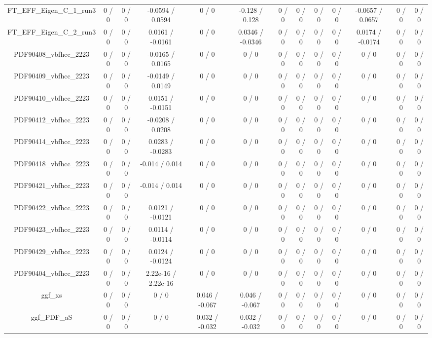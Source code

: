 \documentclass[10pt]{article}
\begin{document}
\begin{table}[htbp]
\begin{center}
\begin{tabular}{|c|c|c|c|c|c|c|c|c|c|c|c|c|}
  FT_EFF_Eigen_C_1_run3 & 0 / 0 & 0 / 0 & -0.0594 / 0.0594 & 0 / 0 & -0.128 / 0.128 & 0 / 0 & 0 / 0 & 0 / 0 & 0 / 0 & -0.0657 / 0.0657 & 0 / 0 & 0 / 0 \\ 
  FT_EFF_Eigen_C_2_run3 & 0 / 0 & 0 / 0 & 0.0161 / -0.0161 & 0 / 0 & 0.0346 / -0.0346 & 0 / 0 & 0 / 0 & 0 / 0 & 0 / 0 & 0.0174 / -0.0174 & 0 / 0 & 0 / 0 \\ 
  PDF90408_vbfhcc_2223 & 0 / 0 & 0 / 0 & -0.0165 / 0.0165 & 0 / 0 & 0 / 0 & 0 / 0 & 0 / 0 & 0 / 0 & 0 / 0 & 0 / 0 & 0 / 0 & 0 / 0 \\ 
  PDF90409_vbfhcc_2223 & 0 / 0 & 0 / 0 & -0.0149 / 0.0149 & 0 / 0 & 0 / 0 & 0 / 0 & 0 / 0 & 0 / 0 & 0 / 0 & 0 / 0 & 0 / 0 & 0 / 0 \\ 
  PDF90410_vbfhcc_2223 & 0 / 0 & 0 / 0 & 0.0151 / -0.0151 & 0 / 0 & 0 / 0 & 0 / 0 & 0 / 0 & 0 / 0 & 0 / 0 & 0 / 0 & 0 / 0 & 0 / 0 \\ 
  PDF90412_vbfhcc_2223 & 0 / 0 & 0 / 0 & -0.0208 / 0.0208 & 0 / 0 & 0 / 0 & 0 / 0 & 0 / 0 & 0 / 0 & 0 / 0 & 0 / 0 & 0 / 0 & 0 / 0 \\ 
  PDF90414_vbfhcc_2223 & 0 / 0 & 0 / 0 & 0.0283 / -0.0283 & 0 / 0 & 0 / 0 & 0 / 0 & 0 / 0 & 0 / 0 & 0 / 0 & 0 / 0 & 0 / 0 & 0 / 0 \\ 
  PDF90418_vbfhcc_2223 & 0 / 0 & 0 / 0 & -0.014 / 0.014 & 0 / 0 & 0 / 0 & 0 / 0 & 0 / 0 & 0 / 0 & 0 / 0 & 0 / 0 & 0 / 0 & 0 / 0 \\ 
  PDF90421_vbfhcc_2223 & 0 / 0 & 0 / 0 & -0.014 / 0.014 & 0 / 0 & 0 / 0 & 0 / 0 & 0 / 0 & 0 / 0 & 0 / 0 & 0 / 0 & 0 / 0 & 0 / 0 \\ 
  PDF90422_vbfhcc_2223 & 0 / 0 & 0 / 0 & 0.0121 / -0.0121 & 0 / 0 & 0 / 0 & 0 / 0 & 0 / 0 & 0 / 0 & 0 / 0 & 0 / 0 & 0 / 0 & 0 / 0 \\ 
  PDF90423_vbfhcc_2223 & 0 / 0 & 0 / 0 & 0.0114 / -0.0114 & 0 / 0 & 0 / 0 & 0 / 0 & 0 / 0 & 0 / 0 & 0 / 0 & 0 / 0 & 0 / 0 & 0 / 0 \\ 
  PDF90429_vbfhcc_2223 & 0 / 0 & 0 / 0 & 0.0124 / -0.0124 & 0 / 0 & 0 / 0 & 0 / 0 & 0 / 0 & 0 / 0 & 0 / 0 & 0 / 0 & 0 / 0 & 0 / 0 \\ 
  PDF90404_vbfhcc_2223 & 0 / 0 & 0 / 0 & 2.22e-16 / 2.22e-16 & 0 / 0 & 0 / 0 & 0 / 0 & 0 / 0 & 0 / 0 & 0 / 0 & 0 / 0 & 0 / 0 & 0 / 0 \\ 
  ggf_xs & 0 / 0 & 0 / 0 & 0 / 0 & 0.046 / -0.067 & 0.046 / -0.067 & 0 / 0 & 0 / 0 & 0 / 0 & 0 / 0 & 0 / 0 & 0 / 0 & 0 / 0 \\ 
  ggf_PDF_aS & 0 / 0 & 0 / 0 & 0 / 0 & 0.032 / -0.032 & 0.032 / -0.032 & 0 / 0 & 0 / 0 & 0 / 0 & 0 / 0 & 0 / 0 & 0 / 0 & 0 / 0 \\ 

\end{tabular}
\end{center}
\end{table}
\end{document}

